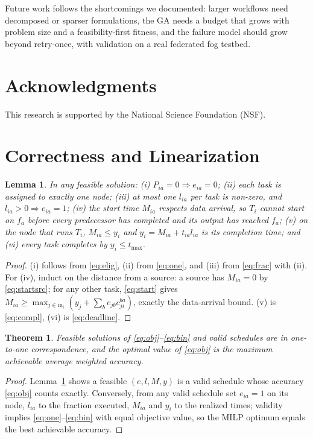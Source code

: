 \documentclass[conference]{IEEEtran}
\newtheorem{lemma}{Lemma}
\newtheorem{theorem}{Theorem}
\begin{document}
Future work follows the shortcomings we documented: larger workflows need decomposed or sparser formulations, the GA needs a budget that grows with problem size and a feasibility-first fitness, and the failure model should grow beyond retry-once, with validation on a real federated fog testbed.

\section*{Acknowledgments}

This research is supported by the National Science Foundation (NSF).

\appendix
\section{Correctness and Linearization}
\label{app:proofs}

\begin{lemma}
\label{lem:wellformed}
In any feasible solution: (i) $P_{ia}=0\Rightarrow e_{ia}=0$;
(ii) each task is assigned to exactly one node;
(iii) at most one $l_{ia}$ per task is non-zero, and
$l_{ia}>0\Rightarrow e_{ia}=1$;
(iv) the start time $M_{ia}$ respects data arrival, so $T_i$ cannot
start on $f_a$ before every predecessor has completed and its output
has reached $f_a$;
(v) on the node that runs $T_i$, $M_{ia}\le y_i$ and
$y_i=M_{ia}+t_{ia}l_{ia}$ is its completion time; and
(vi) every task completes by $y_i\le t_{\max}$.
\end{lemma}
\begin{proof}
(i) follows from \eqref{eq:elig}, (ii) from \eqref{eq:one}, and (iii)
from \eqref{eq:frac} with (ii). For (iv), induct on the distance from a
source: a source has $M_{ia}=0$ by \eqref{eq:startsrc}; for any other
task, \eqref{eq:start} gives
$M_{ia}\ge\max_{j\in\mathrm{in}_i}(y_j+\sum_{b}e_{jb}c_{ji}^{ba})$,
exactly the data-arrival bound. (v) is \eqref{eq:compl}, (vi) is
\eqref{eq:deadline}.
\end{proof}

\begin{theorem}
\label{thm:correspondence}
Feasible solutions of \eqref{eq:obj}--\eqref{eq:bin} and valid schedules
are in one-to-one correspondence, and the optimal value of
\eqref{eq:obj} is the maximum achievable average weighted accuracy.
\end{theorem}
\begin{proof}
Lemma~\ref{lem:wellformed} shows a feasible $(e,l,M,y)$ is a valid
schedule whose accuracy \eqref{eq:obj} counts exactly. Conversely, from
any valid schedule set $e_{ia}=1$ on its node, $l_{ia}$ to the fraction
executed, $M_{ia}$ and $y_i$ to the realized times;
validity implies \eqref{eq:one}--\eqref{eq:bin} with equal objective
value, so the MILP optimum equals the best achievable accuracy.
\end{proof}
\end{document}
